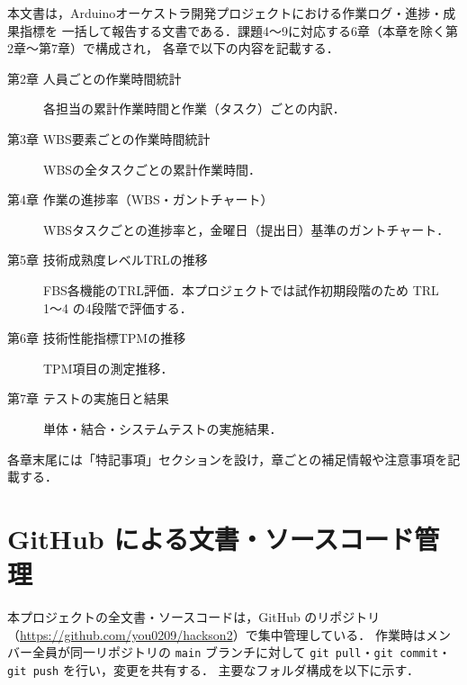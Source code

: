
本文書は，Arduinoオーケストラ開発プロジェクトにおける作業ログ・進捗・成果指標を
一括して報告する文書である．課題4〜9に対応する6章（本章を除く第2章〜第7章）で構成され，
各章で以下の内容を記載する．

\begin{description}
  \item[第2章 人員ごとの作業時間統計] 各担当の累計作業時間と作業（タスク）ごとの内訳．
  \item[第3章 WBS要素ごとの作業時間統計] WBSの全タスクごとの累計作業時間．
  \item[第4章 作業の進捗率（WBS・ガントチャート）] WBSタスクごとの進捗率と，金曜日（提出日）基準のガントチャート．
  \item[第5章 技術成熟度レベルTRLの推移] FBS各機能のTRL評価．本プロジェクトでは試作初期段階のため TRL 1〜4 の4段階で評価する．
  \item[第6章 技術性能指標TPMの推移] TPM項目の測定推移．
  \item[第7章 テストの実施日と結果] 単体・結合・システムテストの実施結果．
\end{description}

各章末尾には「特記事項」セクションを設け，章ごとの補足情報や注意事項を記載する．

\section{GitHub による文書・ソースコード管理}

本プロジェクトの全文書・ソースコードは，GitHub のリポジトリ
（\url{https://github.com/you0209/hackson2}）で集中管理している．
作業時はメンバー全員が同一リポジトリの \texttt{main} ブランチに対して
\texttt{git pull}・\texttt{git commit}・\texttt{git push} を行い，変更を共有する．
主要なフォルダ構成を以下に示す．

